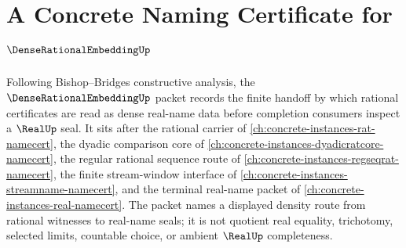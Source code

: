 \chapter{A Concrete Naming Certificate for $\DenseRationalEmbeddingUp$}
\label{ch:concrete-instances-dense-rational-embedding-namecert}

Following Bishop--Bridges constructive analysis, the $\DenseRationalEmbeddingUp$ packet records the finite handoff by which rational certificates are read as dense real-name data before completion consumers inspect a $\RealUp$ seal. It sits after the rational carrier of \autoref{ch:concrete-instances-rat-namecert}, the dyadic comparison core of \autoref{ch:concrete-instances-dyadicratcore-namecert}, the regular rational sequence route of \autoref{ch:concrete-instances-regseqrat-namecert}, the finite stream-window interface of \autoref{ch:concrete-instances-streamname-namecert}, and the terminal real-name packet of \autoref{ch:concrete-instances-real-namecert}. The packet names a displayed density route from rational witnesses to real-name seals; it is not quotient real equality, trichotomy, selected limits, countable choice, or ambient $\RealUp$ completeness.

